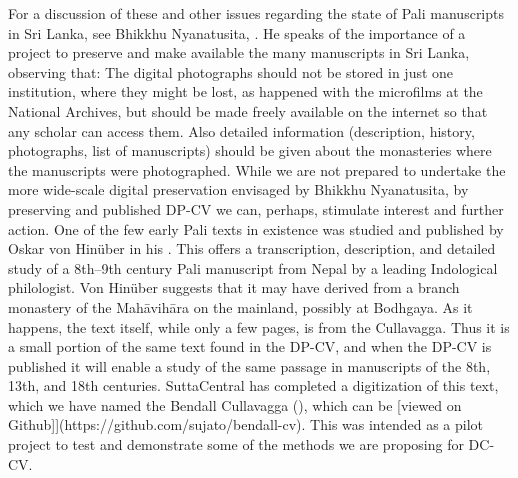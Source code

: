 {}For a discussion of these and other issues regarding the state of Pali manuscripts in Sri Lanka, see Bhikkhu Nyanatusita, . He speaks of the importance of a project to preserve and make available the many manuscripts in Sri Lanka, observing that:\markdownRendererInterblockSeparator
{}\markdownRendererBlockQuoteBegin
The digital photographs should not be stored in just one institution, where they might be lost, as happened with the microfilms at the National Archives, but should be made freely available on the internet so that any scholar can access them. Also detailed information (description, history, photographs, list of manuscripts) should be given about the monasteries where the manuscripts were photographed.
\markdownRendererBlockQuoteEnd \markdownRendererInterblockSeparator
{}While we are not prepared to undertake the more wide-scale digital preservation envisaged by Bhikkhu Nyanatusita, by preserving and published DP-CV we can, perhaps, stimulate interest and further action.\markdownRendererInterblockSeparator
{}One of the few early Pali texts in existence was studied and published by Oskar von Hinüber in his . This offers a transcription, description, and detailed study of a 8th–9th century Pali manuscript from Nepal by a leading Indological philologist. Von Hinüber suggests that it may have derived from a branch monastery of the Mahāvihāra on the mainland, possibly at Bodhgaya.\markdownRendererInterblockSeparator
{}As it happens, the text itself, while only a few pages, is from the Cullavagga. Thus it is a small portion of the same text found in the DP-CV, and when the DP-CV is published it will enable a study of the same passage in manuscripts of the 8th, 13th, and 18th centuries. SuttaCentral has completed a digitization of this text, which we have named the Bendall Cullavagga (), which can be [viewed on Github]](https://github.com/sujato/bendall-cv). This was intended as a pilot project to test and demonstrate some of the methods we are proposing for DC-CV.\markdownRendererInterblockSeparator

